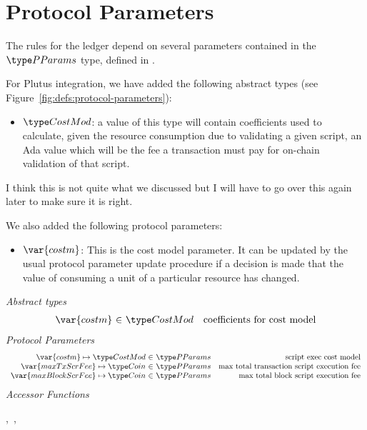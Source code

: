 \section{Protocol Parameters}
\label{sec:protocol-parameters}

The rules for the ledger depend on several parameters contained in the $\PParams$ type,
defined in \cite{byron_ledger_spec}.

For Plutus integration, we have added the following abstract types
(see Figure~\ref{fig:defs:protocol-parameters}):

\begin{itemize}
\item $\CostMod$: a value of this type will contain coefficients used to calculate,
given the resource
consumption due to validating a given script,
an Ada value which will be the fee a transaction must pay for on-chain
validation of that script.
\end{itemize}

\begin{note}
   I think this is not quite what we discussed but I will have to go over this
   again later to make sure it is right.
\end{note}

We also added the following protocol parameters:

\begin{itemize}
  \item $\var{costm}$: This is the cost model parameter. It can be updated by
  the usual protocol parameter update procedure if a decision is made that
  the value of consuming a unit of a particular resource has changed.
\end{itemize}


\begin{figure*}[htb]
  \emph{Abstract types}
  \begin{equation*}
    \begin{array}{r@{~\in~}lr}
      \var{costm} & \CostMod & \text{coefficients for cost model} \\
    \end{array}
  \end{equation*}
  \emph{Protocol Parameters}
  \begin{equation*}
      \begin{array}{r@{~\in~}lr}
        \var{costm} \mapsto \CostMod & \PParams & \text{script exec cost model}\\
        \var{maxTxScrFee} \mapsto \Coin & \PParams & \text{max total transaction script execution fee}\\
        \var{maxBlockScrFee} \mapsto \Coin & \PParams & \text{max total block script execution fee}\\
      \end{array}
  \end{equation*}
  \emph{Accessor Functions}
  \begin{center}
  ,~,~
  \end{center}
  \caption{Definitions Used in Protocol Parameters}
  \label{fig:defs:protocol-parameters}
\end{figure*}


\clearpage
